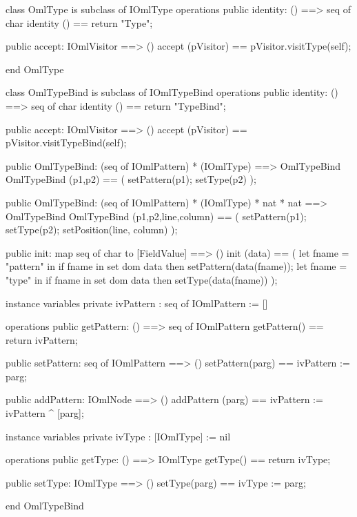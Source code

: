 \begin{vdm_al}
class OmlType is subclass of IOmlType
operations
  public identity: () ==> seq of char
  identity () == return "Type";

  public accept: IOmlVisitor ==> ()
  accept (pVisitor) == pVisitor.visitType(self);

end OmlType
\end{vdm_al}
\begin{vdm_al}
class OmlTypeBind is subclass of IOmlTypeBind
operations
  public identity: () ==> seq of char
  identity () == return "TypeBind";

  public accept: IOmlVisitor ==> ()
  accept (pVisitor) == pVisitor.visitTypeBind(self);

  public OmlTypeBind:
    (seq of IOmlPattern) *
    (IOmlType) ==> OmlTypeBind
  OmlTypeBind (p1,p2) == 
    ( setPattern(p1);
      setType(p2) );

  public OmlTypeBind:
    (seq of IOmlPattern) *
    (IOmlType) *
    nat *
    nat ==> OmlTypeBind
  OmlTypeBind (p1,p2,line,column) == 
    ( setPattern(p1);
      setType(p2);
      setPosition(line, column) );

  public init: map seq of char to [FieldValue] ==> ()
  init (data) ==
    ( let fname = "pattern" in
        if fname in set dom data
        then setPattern(data(fname));
      let fname = "type" in
        if fname in set dom data
        then setType(data(fname)) );

instance variables
  private ivPattern : seq of IOmlPattern := []

operations
  public getPattern: () ==> seq of IOmlPattern
  getPattern() == return ivPattern;

  public setPattern: seq of IOmlPattern ==> ()
  setPattern(parg) == ivPattern := parg;

  public addPattern: IOmlNode ==> ()
  addPattern (parg) == ivPattern := ivPattern ^ [parg];

instance variables
  private ivType : [IOmlType] := nil

operations
  public getType: () ==> IOmlType
  getType() == return ivType;

  public setType: IOmlType ==> ()
  setType(parg) == ivType := parg;

end OmlTypeBind
\end{vdm_al}

